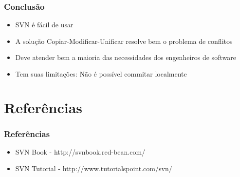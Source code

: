 \documentclass{beamer}
\begin{document}
\begin{frame}
    \frametitle{Conclus\~ao}

    \begin{itemize}
        \item SVN \'e f\'acil de usar
        \item A solu\c{c}\~ao Copiar-Modificar-Unificar resolve bem o problema de conflitos
        \item Deve atender bem a maioria das necessidades dos engenheiros de software
        \item Tem suas limita\c{c}\~oes: N\~ao \'e poss\'ivel commitar localmente
    \end{itemize}
\end{frame}

\section{Refer\^encias}
\begin{frame}
    \frametitle{Refer\^encias}

    \begin{itemize}
        \item SVN Book - http://svnbook.red-bean.com/
        \item SVN Tutorial - http://www.tutorialspoint.com/svn/
    \end{itemize}
\end{frame}
\end{document}
